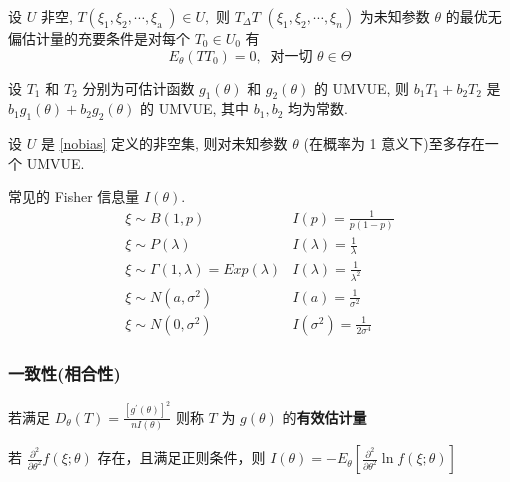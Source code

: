 \documentclass[10pt]{yerbaformat}
\begin{document}
\begin{theorem}
    设 $U$ 非空, $T\left(\xi_{1}, \xi_{2}, \cdots, \xi_{\text {a }}\right) \in U,$ 则 $T_{\Delta} T$ $\left(\xi_{1}, \xi_{2}, \cdots, \xi_{n}\right)$ 为未知参数 $\theta$ 的最优无偏估计量的充要条件是对每个 $T_{0} \in U_{0}$ 有 $$E_{\theta}\left(T T_{0}\right)=0, \  \text { 对一切 } \theta \in \Theta$$
\end{theorem}

\begin{proposition}
    设 $T_{1}$ 和 $T_{2}$ 分别为可估计函数 $g_{1}(\theta)$ 和 $g_{2}(\theta)$ 的 UMVUE, 则 $b_{1} T_{1}+b_{2} T_{2}$ 是 $b_{1} g_{1}(\theta)+b_{2} g_{2}(\theta)$ 的 UMVUE,
    其中 $b_{1}, b_{2}$ 均为常数.
\end{proposition}

\begin{theorem}
    设 $U$ 是 \ref{nobias} 定义的非空集, 则对未知参数 $\theta$  (在概率为 1 意义下)至多存在一个 UMVUE.
\end{theorem}

\par 常见的 Fisher 信息量 $I(\theta)$. $$\begin{array}{cc}
        \xi \sim B(1, p)                           & I(p)=\frac{1}{p(1-p)}                           \\
        \xi \sim P(\lambda)                        & I(\lambda)=\frac{1}{\lambda}                    \\
        \xi \sim \Gamma(1, \lambda)=E x p(\lambda) & I(\lambda)=\frac{1}{\lambda^{2}}                \\
        \xi \sim N\left(a, \sigma^{2}\right)       & I(a)=\frac{1}{\sigma^{2}}                       \\
        \xi \sim N\left(0, \sigma^{2}\right)       & I\left(\sigma^{2}\right)=\frac{1}{2 \sigma^{4}}
    \end{array}$$

\subsubsection{一致性(相合性)}

\begin{definition}
    若满足 $D_{\theta}(T)=\frac{\left[g^{\prime}(\theta)\right]^{2}}{n I(\theta)}$ 则称 $T$ 为 $g(\theta)$ 的\textbf{有效估计量}
\end{definition}
\par 若 $\frac{\partial^{2}}{\partial \theta^{2}} f(\xi ; \theta)$ 存在，且满足正则条件，则 $I(\theta)=-E_{\theta}\left[\frac{\partial^{2}}{\partial \theta^{2}} \ln f(\xi ; \theta)\right]$
\end{document}
